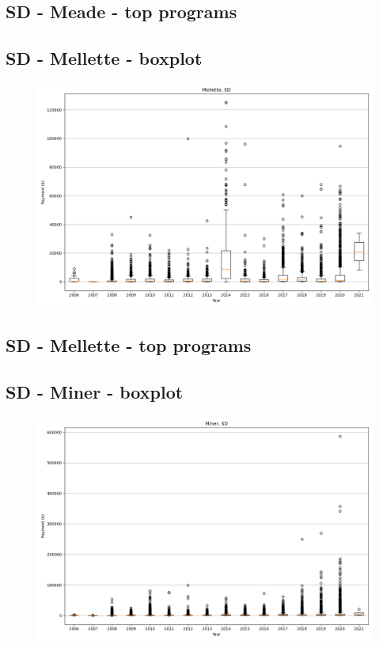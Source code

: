 \subsection*{SD - Meade - top programs}

\newpage
\subsection*{SD - Mellette - boxplot}
\begin{figure}[h]
\centering
\includegraphics[width=7in]{../output/boxplots/counties/Mellette-SD_boxplot.png}
\end{figure}


\subsection*{SD - Mellette - top programs}

\newpage
\subsection*{SD - Miner - boxplot}
\begin{figure}[h]
\centering
\includegraphics[width=7in]{../output/boxplots/counties/Miner-SD_boxplot.png}
\end{figure}


